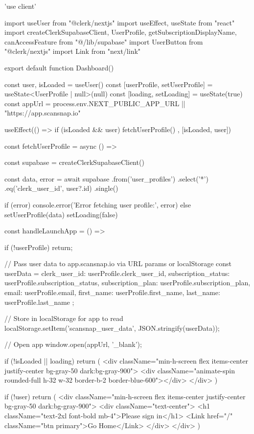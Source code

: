 'use client'

import { useUser } from "@clerk/nextjs"
import { useEffect, useState } from "react"
import { createClerkSupabaseClient, UserProfile, getSubscriptionDisplayName, canAccessFeature } from "@/lib/supabase"
import { UserButton } from "@clerk/nextjs"
import Link from "next/link"

export default function Dashboard() {
  const { user, isLoaded } = useUser()
  const [userProfile, setUserProfile] = useState<UserProfile | null>(null)
  const [loading, setLoading] = useState(true)
  const appUrl = process.env.NEXT_PUBLIC_APP_URL || "https://app.scansnap.io"

  useEffect(() => {
    if (isLoaded && user) {
      fetchUserProfile()
    }
  }, [isLoaded, user])

  const fetchUserProfile = async () => {
    const supabase = createClerkSupabaseClient()
    
    const { data, error } = await supabase
      .from('user_profiles')
      .select('*')
      .eq('clerk_user_id', user?.id)
      .single()

    if (error) {
      console.error('Error fetching user profile:', error)
    } else {
      setUserProfile(data)
    }
    setLoading(false)
  }

  const handleLaunchApp = () => {
    if (!userProfile) return;
    
    // Pass user data to app.scansnap.io via URL params or localStorage
    const userData = {
      clerk_user_id: userProfile.clerk_user_id,
      subscription_status: userProfile.subscription_status,
      subscription_plan: userProfile.subscription_plan,
      email: userProfile.email,
      first_name: userProfile.first_name,
      last_name: userProfile.last_name
    };
    
    // Store in localStorage for app to read
    localStorage.setItem('scansnap_user_data', JSON.stringify(userData));
    
    // Open app
    window.open(appUrl, '_blank');
  }

  if (!isLoaded || loading) {
    return (
      <div className="min-h-screen flex items-center justify-center bg-gray-50 dark:bg-gray-900">
        <div className="animate-spin rounded-full h-32 w-32 border-b-2 border-blue-600"></div>
      </div>
    )
  }

  if (!user) {
    return (
      <div className="min-h-screen flex items-center justify-center bg-gray-50 dark:bg-gray-900">
        <div className="text-center">
          <h1 className="text-2xl font-bold mb-4">Please sign in</h1>
          <Link href="/" className="btn primary">Go Home</Link>
        </div>
      </div>
    )
  }

}
